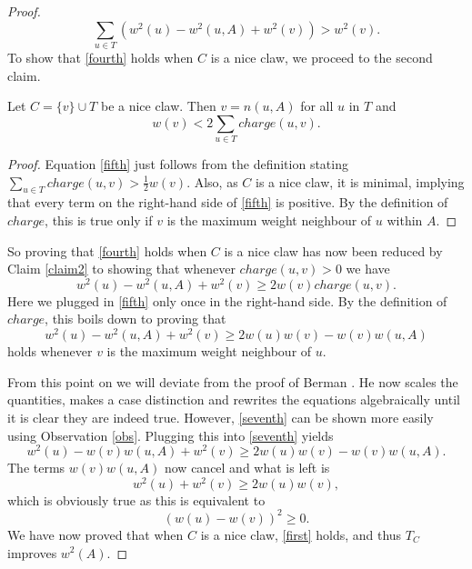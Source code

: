 \begin{proof}
\begin{equation}
\sum_{u \in T} \left( w^2(u) - w^2(u,A) + w^2(v) \right) > w^2(v).
\end{equation}
%
To show that \eqref{fourth} holds when $C$ is a nice claw, we proceed to the second claim.
%
\begin{claim}\label{claim2}
Let $C = \{v\} \cup T$ be a nice claw. Then $v = n(u,A)$ for all $u$ in $T$ and
%
\begin{equation}\label{fifth}
w(v) < 2 \sum_{u \in T} charge(u,v).
\end{equation}
\end{claim}
%
\begin{proof}
Equation \eqref{fifth} just follows from the definition stating $\sum_{u \in T} charge(u,v) > \frac{1}{2}w(v)$. Also, as $C$ is a nice claw, it is minimal, implying that every term on the right-hand side of \eqref{fifth} is positive. By the definition of $charge$, this is true only if $v$ is the maximum weight neighbour of $u$ within $A$.
\end{proof}

So proving that \eqref{fourth} holds when $C$ is a nice claw has now been reduced by Claim \ref{claim2} to showing that whenever $charge(u,v)>0$ we have
%
\begin{equation*}
w^2(u) - w^2(u,A) + w^2(v) \geq 2w(v)charge(u,v).
\end{equation*}
%
Here we plugged in \eqref{fifth} only once in the right-hand side. By the definition of $charge$, this boils down to proving that
%
\begin{equation}\label{seventh}
w^2(u) - w^2(u,A) + w^2(v) \geq 2w(u)w(v) - w(v)w(u,A)
\end{equation}
%
holds whenever $v$ is the maximum weight neighbour of $u$.

From this point on we will deviate from the proof of Berman \cite{Berman}. He now scales the quantities, makes a case distinction and rewrites the equations algebraically until it is clear they are indeed true. However, \eqref{seventh} can be shown more easily using Observation \ref{obs}. Plugging this into \eqref{seventh} yields
%
\begin{equation*}
w^2(u) - w(v)w(u,A) + w^2(v) \geq 2w(u)w(v) - w(v)w(u,A).
\end{equation*}
%
The terms $w(v)w(u,A)$ now cancel and what is left is
%
\begin{equation}\label{eighth}
w^2(u) + w^2(v) \geq 2w(u)w(v),
\end{equation}
%
which is obviously true as this is equivalent to
%
\begin{equation*}
(w(u)-w(v))^2 \geq 0.
\end{equation*}
%
We have now proved that when $C$ is a nice claw, \eqref{first} holds, and thus $T_C$ improves $w^2(A)$.
\end{proof}

